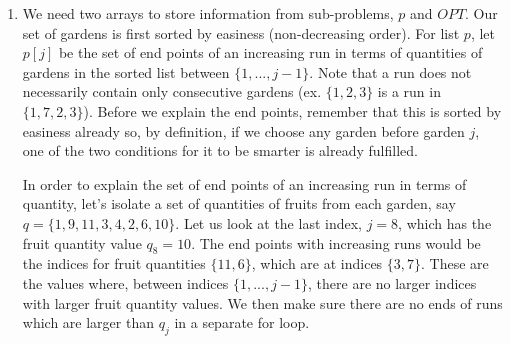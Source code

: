 \documentclass{article}
\newcommand{\bigO}{\mathcal{O}}
\begin{document}
\begin{enumerate}
        
    
    \begin{enumerate}
        \item We need two arrays to store information from sub-problems, $p$ and $OPT$. Our set of gardens is first sorted by easiness (non-decreasing order). For list $p$, let $p[j]$ be the set of end points of an increasing run in terms of quantities of gardens in the sorted list between $\{ 1, ..., j-1\}$. Note that a run does not necessarily contain only consecutive gardens (ex. $\{1, 2, 3\}$ is a run in $\{1, 7, 2, 3\}$). Before we explain the end points, remember that this is sorted by easiness already so, by definition, if we choose any garden before garden $j$, one of the two conditions for it to be smarter is already fulfilled.
        
        In order to explain the set of end points of an increasing run in terms of quantity, let's isolate a set of quantities of fruits from each garden, say $q=\{1, 9, 11, 3, 4, 2, 6, 10\}$. Let us look at the last index, $j=8$, which has the fruit quantity value $q_8=10$. The end points with increasing runs would be the indices for fruit quantities $\{11, 6\}$, which are at indices $\{3, 7\}$. These are the values where, between indices $\{1, ..., j-1\}$, there are no larger indices with larger fruit quantity values. We then make sure there are no ends of runs which are larger than $q_j$ in a separate for loop.
        

\end{enumerate}
\end{enumerate}
\end{document}
